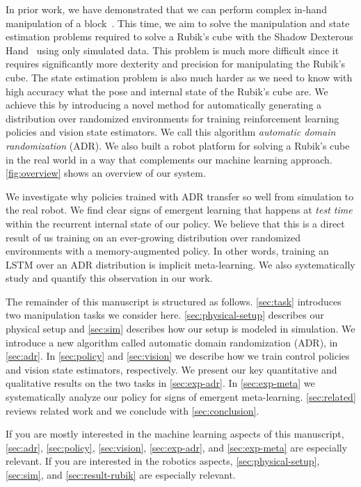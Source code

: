 In prior work, we have demonstrated that we can perform complex in-hand manipulation of a block~\cite{openai2018learning}. This time, we aim to solve the manipulation and state estimation problems required to solve a Rubik's cube with the Shadow Dexterous Hand~\cite{shadow-robot} using only simulated data. This problem is much more difficult since it requires significantly more dexterity and precision for manipulating the Rubik's cube. The state estimation problem is also much harder as we need to know with high accuracy what the pose and internal state of the Rubik's cube are. We achieve this by introducing a novel method for automatically generating a distribution over randomized environments for training reinforcement learning policies and vision state estimators. We call this algorithm \emph{automatic domain randomization} (ADR). We also built a robot platform for solving a Rubik's cube in the real world in a way that complements our machine learning approach. \autoref{fig:overview} shows an overview of our system.

We investigate why policies trained with ADR transfer so well from simulation to the real robot. We find clear signs of emergent learning that happens at \emph{test time} within the recurrent internal state of our policy. We believe that this is a direct result of us training on an ever-growing distribution over randomized environments with a memory-augmented policy. In other words, training an LSTM over an ADR distribution is implicit meta-learning. We also systematically study and quantify this observation in our work.


The remainder of this manuscript is structured as follows. \autoref{sec:task} introduces two manipulation tasks we consider here. \autoref{sec:physical-setup} describes our physical setup and \autoref{sec:sim} describes how our setup is modeled in simulation. We introduce a new algorithm called automatic domain randomization (ADR), in \autoref{sec:adr}. In \autoref{sec:policy} and \autoref{sec:vision} we describe how we train control policies and vision state estimators, respectively. We present our key quantitative and qualitative results on the two tasks in \autoref{sec:exp-adr}. In \autoref{sec:exp-meta} we systematically analyze our policy for signs of emergent meta-learning. \autoref{sec:related} reviews related work and we conclude with \autoref{sec:conclusion}.

If you are mostly interested in the machine learning aspects of this manuscript, \autoref{sec:adr},  \autoref{sec:policy},  \autoref{sec:vision}, \autoref{sec:exp-adr}, and \autoref{sec:exp-meta} are especially relevant. If you are interested in the robotics aspects, \autoref{sec:physical-setup}, \autoref{sec:sim}, and \autoref{sec:result-rubik} are especially relevant.
